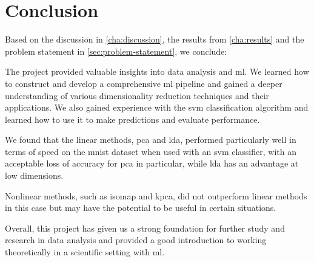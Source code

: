\chapter{Conclusion}\label{cha:conclusion}
Based on the discussion in \autoref{cha:discussion}, the results from \autoref{cha:results} and the problem statement in \autoref{sec:problem-statement}, we conclude:

The project provided valuable insights into data analysis and \gls{ml}. We learned how to construct and develop a comprehensive \gls{ml} pipeline and gained a deeper understanding of various dimensionality reduction techniques and their applications. We also gained experience with the \gls{svm} classification algorithm and learned how to use it to make predictions and evaluate performance.

We found that the linear methods, \gls{pca} and \gls{lda}, performed particularly well in terms of speed on the \gls{mnist} dataset when used with an \gls{svm} classifier, with an acceptable loss of accuracy for \gls{pca} in particular, while \gls{lda} has an advantage at low dimensions.

Nonlinear methods, such as \gls{isomap} and \gls{kpca}, did not outperform linear methods in this case but may have the potential to be useful in certain situations.

Overall, this project has given us a strong foundation for further study and research in data analysis and provided a good introduction to working theoretically in a scientific setting with \gls{ml}.

